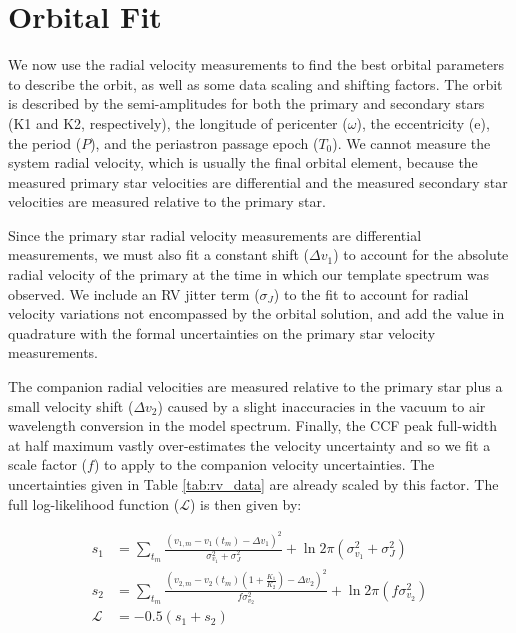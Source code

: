 \documentclass[twocolumn]{emulateapj}
\begin{document}
\section{Orbital Fit}
\label{sec:orbit}

We now use the radial velocity measurements to find the best orbital parameters to describe the orbit, as well as some data scaling and shifting factors. The orbit is described by the semi-amplitudes for both the primary and secondary stars (K1 and K2, respectively), the longitude of pericenter ($\omega$), the eccentricity (e), the period ($P$), and the periastron passage epoch ($T_0$). We cannot measure the system radial velocity, which is usually the final orbital element, because the measured primary star velocities are differential and the measured secondary star velocities are measured relative to the primary star.

Since the primary star radial velocity measurements are differential measurements, we must also fit a constant shift ($\Delta v_1$) to account for the absolute radial velocity of the primary at the time in which our template spectrum was observed. We include an RV jitter term ($\sigma_J$) to the fit to account for radial velocity variations not encompassed by the orbital solution, and add the value in quadrature with the formal uncertainties on the primary star velocity measurements. 

The companion radial velocities are measured relative to the primary star plus a small velocity shift ($\Delta v_2$) caused by a slight inaccuracies in the vacuum to air wavelength conversion in the model spectrum. Finally, the CCF peak full-width at half maximum vastly over-estimates the velocity uncertainty and so we fit a scale factor ($f$) to apply to the companion velocity uncertainties. The uncertainties given in Table \ref{tab:rv_data} are already scaled by this factor. The full log-likelihood function ($\mathcal{L}$) is then given by:

\begin{align*}
s_1 &= \sum_{t_m} \frac{(v_{1,m} - v_1(t_m) - \Delta v_1)^2 }{\sigma_{v_1}^2 + \sigma_J^2} + \ln{2\pi(\sigma_{v_1}^2 + \sigma_J^2)} \\
s_2 &= \sum_{t_m} \frac{(v_{2,m} - v_2(t_m)(1+\frac{K_1}{K_2}) - \Delta v_2)^2}{f\sigma_{v_2}^2 } + \ln{2\pi(f\sigma_{v_2}^2)} \\ 
\mathcal{L} &= -0.5(s_1 + s_2) \\
\end{align*}
\end{document}
